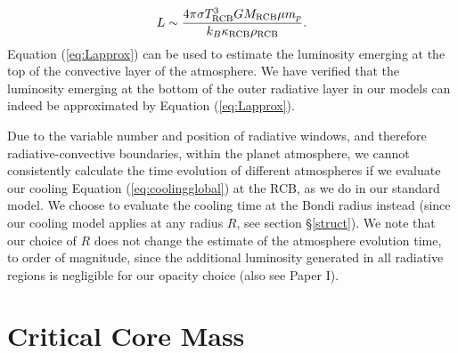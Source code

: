\documentclass[apj]{emulateapj}
\newcommand{\cb}{_{\rm RCB}}
\begin{document}
\begin{equation}
\label{eq:Lapprox}
L \sim \frac{4 \pi \sigma T\cb^3 G M\cb \mu m_p}{k_B \kappa\cb \rho\cb}.
\end{equation}
Equation (\ref{eq:Lapprox}) can be used to estimate the luminosity emerging at the top of the convective layer of the atmosphere. We have verified that the luminosity emerging at the bottom of the outer radiative layer in our models can indeed be approximated by Equation (\ref{eq:Lapprox}). %

Due to the variable number and position of radiative windows, and therefore radiative-convective boundaries, within the planet atmosphere, we cannot consistently calculate the time evolution of different atmospheres if we evaluate our cooling Equation (\ref{eq:coolingglobal}) at the RCB, as we do in our standard model. We choose to evaluate the cooling time at the Bondi radius instead (since our cooling model applies at any radius $R$, see section \S\ref{struct}). We note that our choice of $R$ does not change the estimate of the atmosphere evolution time, to order of magnitude, since the additional luminosity generated in all radiative regions is negligible for our opacity choice (also see Paper I). 






\section{Critical Core Mass}
\label{critical}

\end{document}
